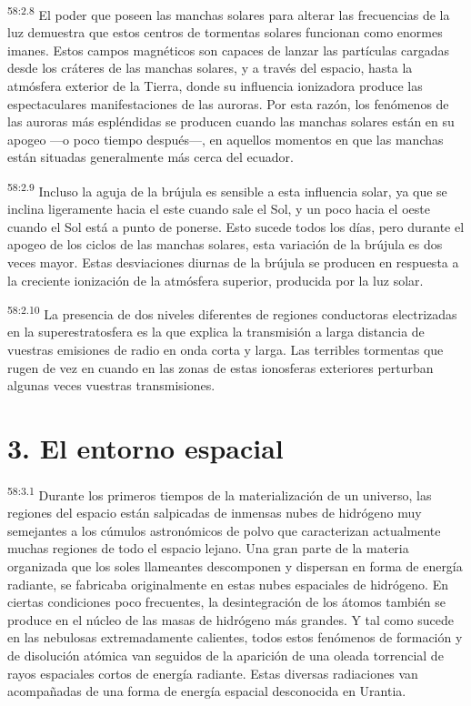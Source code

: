 \par
\textsuperscript{58:2.8} El poder que poseen las manchas solares para alterar las frecuencias de la luz demuestra que estos centros de tormentas solares funcionan como enormes imanes. Estos campos magnéticos son capaces de lanzar las partículas cargadas desde los cráteres de las manchas solares, y a través del espacio, hasta la atmósfera exterior de la Tierra, donde su influencia ionizadora produce las espectaculares manifestaciones de las auroras. Por esta razón, los fenómenos de las auroras más espléndidas se producen cuando las manchas solares están en su apogeo ---o poco tiempo después---, en aquellos momentos en que las manchas están situadas generalmente más cerca del ecuador.

\par
\textsuperscript{58:2.9} Incluso la aguja de la brújula es sensible a esta influencia solar, ya que se inclina ligeramente hacia el este cuando sale el Sol, y un poco hacia el oeste cuando el Sol está a punto de ponerse. Esto sucede todos los días, pero durante el apogeo de los ciclos de las manchas solares, esta variación de la brújula es dos veces mayor. Estas desviaciones diurnas de la brújula se producen en respuesta a la creciente ionización de la atmósfera superior, producida por la luz solar.

\par
\textsuperscript{58:2.10} La presencia de dos niveles diferentes de regiones conductoras electrizadas en la superestratosfera es la que explica la transmisión a larga distancia de vuestras emisiones de radio en onda corta y larga. Las terribles tormentas que rugen de vez en cuando en las zonas de estas ionosferas exteriores perturban algunas veces vuestras transmisiones.

\section*{3. El entorno espacial}
\par
\textsuperscript{58:3.1} Durante los primeros tiempos de la materialización de un universo, las regiones del espacio están salpicadas de inmensas nubes de hidrógeno muy semejantes a los cúmulos astronómicos de polvo que caracterizan actualmente muchas regiones de todo el espacio lejano. Una gran parte de la materia organizada que los soles llameantes descomponen y dispersan en forma de energía radiante, se fabricaba originalmente en estas nubes espaciales de hidrógeno. En ciertas condiciones poco frecuentes, la desintegración de los átomos también se produce en el núcleo de las masas de hidrógeno más grandes. Y tal como sucede en las nebulosas extremadamente calientes, todos estos fenómenos de formación y de disolución atómica van seguidos de la aparición de una oleada torrencial de rayos espaciales cortos de energía radiante. Estas diversas radiaciones van acompañadas de una forma de energía espacial desconocida en Urantia.

